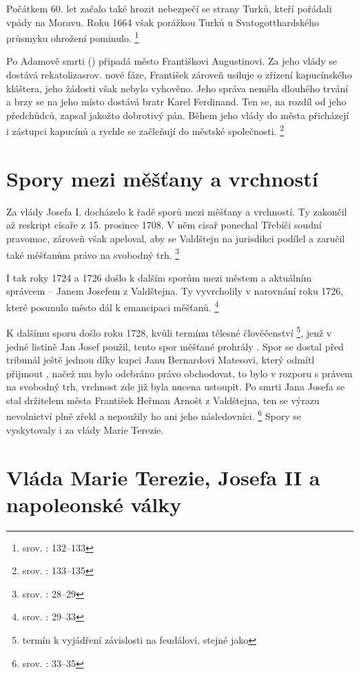\documentclass[a4paper,oneside,12p]{report}
\begin{document}
Počátkem 60. let začalo také hrozit nebezpečí se strany Turků, kteří pořádali vpády na Moravu.
Roku 1664 však porážkou Turků u Svatogotthardského průsmyku ohrožení pominulo. \footnote{srov. \cite{Uhlir1978}: 132--133}

Po Adamově smrti () připadá město Františkovi Augustinovi.
Za jeho vlády se dostává rekatolizasrov. nové fáze, František zároveň usiluje o zřízení kapucínského kláštera, jeho žádosti však nebylo vyhověno.
Jeho správa neměla dlouhého trvání a brzy se na jeho místo dostává bratr Karel Ferdinand.
Ten se, na rozdíl od jeho předchůdců, zapsal jakožto dobrotivý pán.
Během jeho vlády do města přicházejí i zástupci kapucínů a rychle se začleňují do městské společnosti. \footnote{srov. \cite{Uhlir1978}: 133--135}

\section{Spory mezi měšťany a vrchností}

Za vlády Josefa I. docházelo k řadě sporů mezi měšťany a vrchností.
Ty zakončil až reskript císaře z 15. prosince 1708.
V něm císař ponechal Třebíči soudní pravomoc, zároveň však apeloval, aby se Valdštejn na jurisdikci podílel a zaručil také měšťanům právo na svobodný trh. \footnote{srov. : 28--29}

I tak roky 1724 a 1726 došlo k dalším sporům mezi městem a aktuálním správcem -- Janem Josefem z Valdštejna.
Ty vyvrcholily v narovnání roku 1726, které posunulo město dál k emancipaci měšťanů. \footnote{srov. \cite{Janak1981}: 29--33}

K dalšímu sporu došlo roku 1728, kvůli termínu tělesné člověčenství \footnote{termín k vyjádření závislosti na feudálovi, stejné jako }, jenž v jedné listině Jan Josef použil, tento spor měšťané prohrály .
Spor se dostal před tribunál ještě jednou díky kupci Janu Bernardovi Matesovi, který odmítl přijmout , načež mu bylo odebráno právo obchodovat, to bylo v rozporu s právem na svobodný trh, vrchnost zde již byla nucena ustoupit.
Po smrti Jana Josefa se stal držitelem města František Heřman Arnošt z Valdštejna, ten se výrazu nevolnictví plně zřekl a nepoužily ho ani jeho následovníci. \footnote{srov. \cite{Janak1981}: 33--35}
Spory se vyskytovaly i za vlády Marie Terezie.

\section{Vláda Marie Terezie, Josefa II a napoleonské války}
\end{document}
